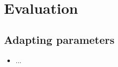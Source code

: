 \chapter{Evaluation}

\section{Adapting parameters}
    \begin{itemize}
        \item ...
    \end{itemize}

